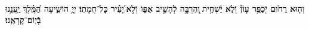 \documentclass[twoside, openany, parskip=half, 11pt]{book}
\begin{document}
%
%
%
%
%
%
%
%
%
%
%
%
%
%
%
%
%
%

\\
\textbf{וְה֤וּא רַח֙וּם יְֿכַפֵּ֥ר עָוֹן֘ וְֿלֹ֢א יַ֫שְׁחִ֥ית ֖וְהִרְבָּ֣ה לְֿהָשִׁ֣יב אַפּ֑וֹ וְֿלֹ֣א ֝יָעִ֗יר כׇּל־חֲמָתֽוֹ׃ יְיָ֥ הוֹשִׁ֑יעָה הַ֝מֶּֽ֗לֶךְ יַֽעֲנֵ֥נוּ בְֿיֽוֹם־קׇרְאֵֽנוּ׃}
\end{document}
